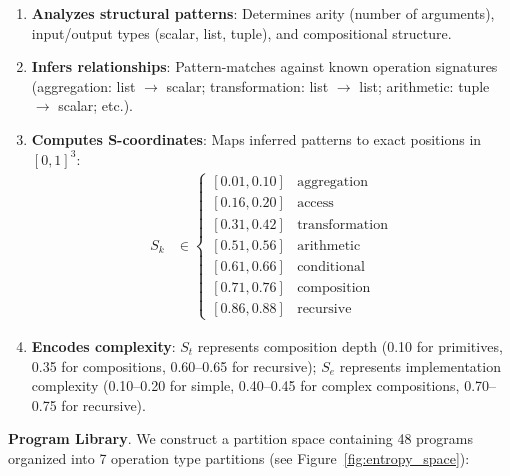 \documentclass[twocolumn,10pt]{article}
\begin{document}
\begin{enumerate}
\item \textbf{Analyzes structural patterns}: Determines arity (number of arguments), input/output types (scalar, list, tuple), and compositional structure.

\item \textbf{Infers relationships}: Pattern-matches against known operation signatures (aggregation: list $\to$ scalar; transformation: list $\to$ list; arithmetic: tuple $\to$ scalar; etc.).

\item \textbf{Computes S-coordinates}: Maps inferred patterns to exact positions in $[0,1]^3$:
\begin{align}
S_k &\in \begin{cases}
[0.01, 0.10] & \text{aggregation} \\
[0.16, 0.20] & \text{access} \\
[0.31, 0.42] & \text{transformation} \\
[0.51, 0.56] & \text{arithmetic} \\
[0.61, 0.66] & \text{conditional} \\
[0.71, 0.76] & \text{composition} \\
[0.86, 0.88] & \text{recursive}
\end{cases}
\end{align}

\item \textbf{Encodes complexity}: $S_t$ represents composition depth (0.10 for primitives, 0.35 for compositions, 0.60--0.65 for recursive); $S_e$ represents implementation complexity (0.10--0.20 for simple, 0.40--0.45 for complex compositions, 0.70--0.75 for recursive).
\end{enumerate}

\textbf{Program Library}. We construct a partition space containing 48 programs organized into 7 operation type partitions (see Figure~\ref{fig:entropy_space}):
\end{document}
